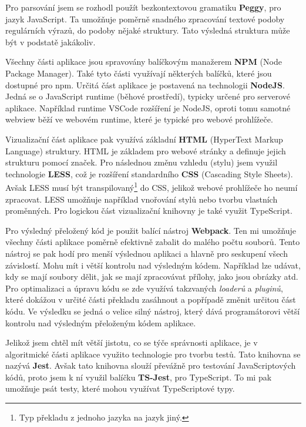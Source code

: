 Pro parsování jsem se rozhodl použít bezkontextovou gramatiku \textbf{Peggy}\cite{Peggy, Peggyjs}, pro jazyk JavaScript.
Ta umožňuje poměrně snadného zpracování textové podoby regulárních výrazů, do podoby nějaké struktury.
Tato výsledná struktura může být v podstatě jakákoliv.

Všechny části aplikace jsou spravovány balíčkovým manažerem \textbf{NPM}\cite{npm} (Node Package Manager).
Také tyto části využívají některých balíčků, které jsou dostupné pro npm. 
Určitá část aplikace je postavená na technologii \textbf{NodeJS}\cite{Node.js}.
Jedná se o JavaScript runtime (běhové prostředí), typicky určené pro serverové aplikace. 
Například runtime VSCode rozšíření je NodeJS, oproti tomu samotné webview běží ve webovém runtime, které je typické pro webové prohlížeče.

Vizualizační část aplikace pak využívá základní \textbf{HTML} (HyperText Markup Language) struktury.  
HTML je základem pro webové stránky a definuje jejich strukturu pomocí značek.
Pro následnou změnu vzhledu (stylu) jsem využil technologie \textbf{LESS}\cite{less}, což je rozšíření standardního \textbf{CSS} (Cascading Style Sheets).
Avšak LESS musí být transpilovaný\footnote{Typ překladu z jednoho jazyka na jazyk jiný.} do CSS, jelikož webové prohlížeče ho neumí zpracovat. 
LESS umožňuje například vnořování stylů nebo tvorbu vlastních proměnných.
Pro logickou část vizualizační knihovny je také využit TypeScript.

Pro výsledný přeložený kód je použit balící nástroj \textbf{Webpack}\cite{webpack}.
Ten mi umožňuje všechny části aplikace poměrně efektivně zabalit do malého počtu souborů. 
Tento nástroj se pak hodí pro menší výslednou aplikaci a hlavně pro seskupení všech závislostí.
Mohu mít i větší kontrolu nad výsledným kódem.
Například lze udávat, kdy se mají soubory dělit, jak se mají zpracovávat přílohy, jako jsou obrázky atd.
Pro optimalizaci a úpravu kódu se zde využívá takzvaných \textit{loaderů} a \textit{pluginů}, 
které dokážou v určité části překladu zasáhnout a popřípadě změnit určitou část kódu.
Ve výsledku se jedná o velice silný nástroj, který dává programátorovi větší kontrolu nad výsledným přeloženým kódem aplikace.

Jelikož jsem chtěl mít větší jistotu, co se týče správnosti aplikace, je v algoritmické části aplikace využito technologie pro tvorbu testů. 
Tato knihovna se nazývá \textbf{Jest}\cite{Jest_RSS}.
Avšak tato knihovna slouží převážně pro testování JavaScriptových kódů, proto jsem k ní využil balíčku \textbf{TS-Jest}\cite{Kabra_2016}, pro TypeScript.
To mi pak umožňuje psát testy, které mohou využívat TypeScriptové typy.

